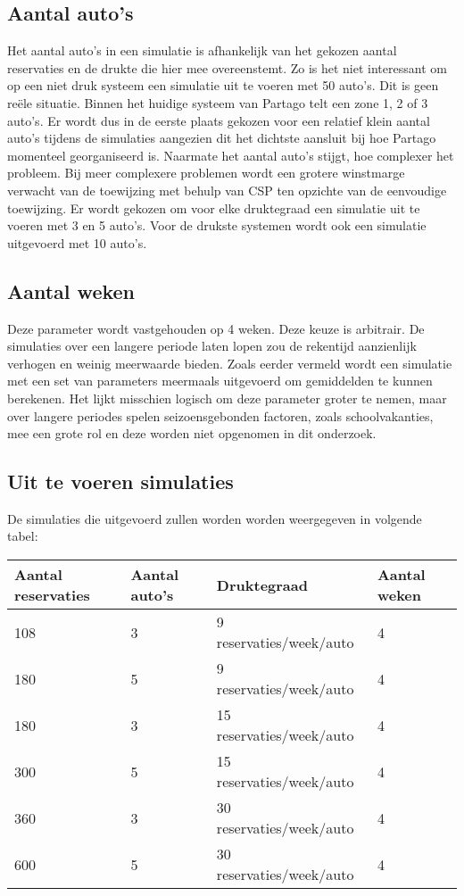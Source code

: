 \subsection{Aantal auto's}
Het aantal auto's in een simulatie is afhankelijk van het gekozen aantal reservaties en de drukte die hier mee overeenstemt. Zo is het niet interessant om op een niet druk systeem een simulatie uit te voeren met 50 auto's. Dit is geen reële situatie. Binnen het huidige systeem van Partago telt een zone 1, 2 of 3 auto's. Er wordt dus in de eerste plaats gekozen voor een relatief klein aantal auto's tijdens de simulaties aangezien dit het dichtste aansluit bij hoe Partago momenteel georganiseerd is. Naarmate het aantal auto's stijgt, hoe complexer het probleem. Bij meer complexere problemen wordt een grotere winstmarge verwacht van de toewijzing met behulp van CSP ten opzichte van de eenvoudige toewijzing. Er wordt gekozen om voor elke druktegraad een simulatie uit te voeren met 3 en 5 auto's. Voor de drukste systemen wordt ook een simulatie uitgevoerd met 10 auto's.
\subsection{Aantal weken}
Deze parameter wordt vastgehouden op 4 weken. Deze keuze is arbitrair. De simulaties over een langere periode laten lopen zou de rekentijd aanzienlijk verhogen en weinig meerwaarde bieden. Zoals eerder vermeld wordt een simulatie met een set van parameters meermaals uitgevoerd om gemiddelden te kunnen berekenen. Het lijkt misschien logisch om deze parameter groter te nemen, maar over langere periodes spelen seizoensgebonden factoren, zoals schoolvakanties, mee een grote rol en deze worden niet opgenomen in dit onderzoek.
\subsection{Uit te voeren simulaties}
De simulaties die uitgevoerd zullen worden worden weergegeven in volgende tabel:
\begin{center}
	\label{tab:parameters}
	\begin{tabular}{ | l | l | l | p{3cm} |}
		\hline
		Aantal reservaties & Aantal auto's & Druktegraad & Aantal weken \\ \hline
		108 & 3 & 9 reservaties/week/auto & 4 \\ \hline
		180 & 5 & 9 reservaties/week/auto & 4 \\ \hline
		180 & 3 & 15 reservaties/week/auto & 4 \\ \hline
		300 & 5 & 15 reservaties/week/auto & 4 \\ \hline
		360 & 3 & 30 reservaties/week/auto & 4 \\ \hline
		600 & 5 & 30 reservaties/week/auto & 4 \\ \hline
	\end{tabular}
\end{center} 

